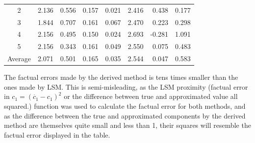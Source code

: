 \begin{table}[!h]
\begin{tabular}{|c|r|r|r|r|r|r|r|}
2                      & 2.136                            & 0.556                            & 0.157                                                                         & 0.021                                                                        & 2.416                            & 0.438                            & 0.177                                                                        \\ \cline{1-1}
3                      & 1.844                            & 0.707                            & 0.161                                                                         & 0.067                                                                        & 2.470                            & 0.223                            & 0.298                                                                        \\ \cline{1-1}
4                      & 2.156                            & 0.495                            & 0.150                                                                         & 0.024                                                                        & 2.693                            & -0.281                           & 1.091                                                                        \\ \cline{1-1}
5                      & 2.156                            & 0.343                            & 0.161                                                                         & 0.049                                                                        & 2.550                            & 0.075                            & 0.483                                                                        \\ \cline{1-1}
Average                & 2.071                            & 0.501                            & 0.165                                                                         & 0.035                                                                        & 2.544                            & 0.047                            & 0.583                                                                        \\ \hline
\end{tabular}
\egroup
\end{table}
The factual errors made by the derived method is tens times smaller than the ones made by LSM. This is semi-misleading, as the LSM proximity (factual error in $c_1=(\dot{c_1}-c_1)^2$ or the difference between true and approximated value all squared.) function was used to calculate the factual error for both methods, and as the difference between the true and approximated components by the derived method are themselves quite small and less than 1, their squares will resemble the factual error displayed in the table.
